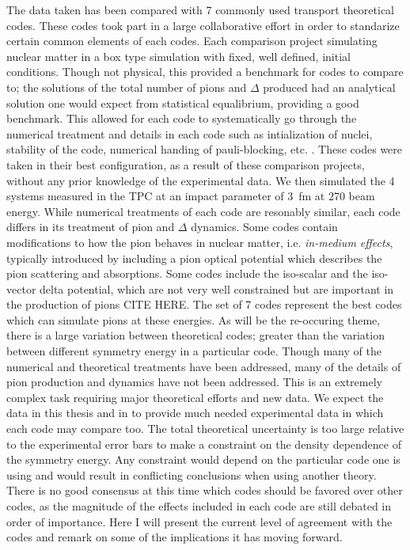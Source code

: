 The data taken has been compared with 7 commonly used transport theoretical codes. These codes took part in a large collaborative effort in order to standarize certain common elements of each codes. Each comparison project simulating nuclear matter in a box type simulation with fixed, well defined, initial conditions. Though not physical, this provided a benchmark for codes to compare to; the solutions of the total number of pions and $\Delta$ produced had an analytical solution one would expect from statistical equalibrium, providing a good benchmark. This allowed for each code to systematically go through the numerical treatment and details in each code such as intialization of nuclei, stability of the code, numerical handing of pauli-blocking, etc. \cite{theoryComp1,theoryComp2}. These codes were taken in their best configuration, as a result of these comparison projects, without any prior knowledge of the experimental data. We then simulated the 4 systems measured in the \spirit TPC at an impact parameter of \SI{3}{\femto\metre} at \SI{270}{\MeVA} beam energy. While numerical treatments of each code are resonably similar, each code differs in its treatment of pion and $\Delta$ dynamics. Some codes contain modifications to how the pion behaves in nuclear matter, i.e. \emph{in-medium effects}, typically introduced by including a pion optical potential which describes the pion scattering and absorptions. Some codes include the iso-scalar and the iso-vector delta potential, which are not very well constrained but are important in the production of pions CITE HERE. The set of 7 codes represent the best codes which can simulate pions at these energies. As will be the re-occuring theme, there is a large variation between theoretical codes; greater than the variation between different symmetry energy in a particular code. Though many of the numerical and theoretical treatments have been addressed, many of the details of pion production and dynamics have not been addressed. This is an extremely complex task requiring major theoretical efforts and new data. We expect the data in this thesis and in \cite{jon} to provide much needed experimental data in which each code may compare too. The total theoretical uncertainty is too large relative to the experimental error bars to make a constraint on the density dependence of the symmetry energy. Any constraint would depend on the particular code one is using and would result in conflicting conclusions when using another theory. There is no good consensus at this time which codes should be favored over other codes, as the magnitude of the effects included in each code are still debated in order of importance. Here I will present the current level of agreement with the codes and remark on some of the implications it has moving forward. 


